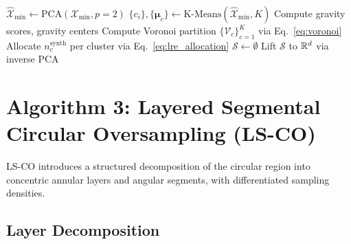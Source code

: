 \begin{algorithm}[H]
\caption{LRE-CO: Local Region Estimation Circular Oversampling}
\label{alg:lre_co}

$\hat{\mathcal{X}}_{\min} \leftarrow \mathrm{PCA}(\mathcal{X}_{\min}, p=2)$\;
$\{c_i\}, \{\boldsymbol{\mu}_c\} \leftarrow \mathrm{K\text{-}Means}(\hat{\mathcal{X}}_{\min}, K)$\;
Compute gravity scores, gravity centers\;
Compute Voronoi partition $\{\mathcal{V}_c\}_{c=1}^K$ via Eq.~\eqref{eq:voronoi}\;
Allocate $n_c^{\text{synth}}$ per cluster via Eq.~\eqref{eq:lre_allocation}\;
$\mathcal{S} \leftarrow \emptyset$\;
Lift $\mathcal{S}$ to $\mathbb{R}^d$ via inverse PCA\;
\end{algorithm}


\section{Algorithm 3: Layered Segmental Circular Oversampling (LS-CO)}
\label{sec:methods:ls_co}

LS-CO introduces a structured decomposition of the circular region into concentric annular layers and angular segments, with differentiated sampling densities.

\subsection{Layer Decomposition}

